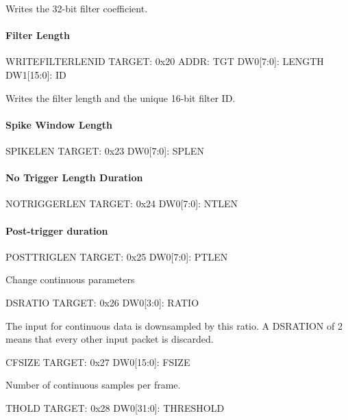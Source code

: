 Writes the 32-bit filter coefficient. 

\paragraph{Filter Length}

\begin{dspcmd}{WRITEFILTERLENID}
TARGET: 0x20
ADDR: TGT
DW0[7:0]: LENGTH
DW1[15:0]: ID
\end{dspcmd}
Writes the filter length and the unique 16-bit filter ID. 

\paragraph{Spike Window Length}

\begin{dspcmd}{SPIKELEN}
TARGET: 0x23
DW0[7:0]: SPLEN
\end{dspcmd}

\paragraph{No Trigger Length Duration}

\begin{dspcmd}{NOTRIGGERLEN}
TARGET: 0x24
DW0[7:0]: NTLEN
\end{dspcmd}

\paragraph{Post-trigger duration}


\begin{dspcmd}{POSTTRIGLEN}
TARGET: 0x25
DW0[7:0]: PTLEN
\end{dspcmd}

Change continuous parameters

\begin{dspcmd}{DSRATIO}
TARGET: 0x26
DW0[3:0]: RATIO
\end{dspcmd}
The input for continuous data is downsampled by this ratio. A DSRATION of 2 means that every other input packet is discarded. 

\begin{dspcmd}{CFSIZE}
TARGET: 0x27
DW0[15:0]: FSIZE
\end{dspcmd}

Number of continuous samples per frame.

\begin{dspcmd}{THOLD}
TARGET: 0x28
DW0[31:0]: THRESHOLD
\end{dspcmd}

